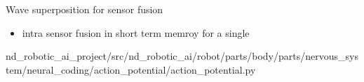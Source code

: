 \section{}
\begin{frame}[allowframebreaks]{Wave superposition for sensor fusion}
    \begin{itemize}
        \item intra sensor fusion in short term memroy for a single  
    \end{itemize}
\end{frame}
    nd_robotic_ai_project/src/nd_robotic_ai/robot/parts/body/parts/nervous_system/neural_coding/action_potential/action_potential.py
\subsection{}
    
    